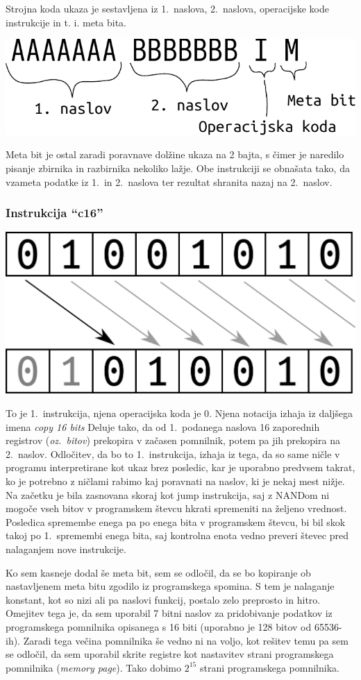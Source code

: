 \documentclass[12pt]{article}
\begin{document}
Strojna koda ukaza je sestavljena iz 1.\ naslova, 2.\ naslova, operacijske kode instrukcije in t. i. meta bita.

\begin{center}
  \includegraphics[width=.5\linewidth]{slike/instrukcija.pdf}
\end{center}

Meta bit je ostal zaradi poravnave dolžine ukaza na 2 bajta, s čimer je naredilo pisanje zbirnika in razbirnika nekoliko lažje.
Obe instrukciji se obnašata tako, da vzameta podatke iz 1.\ in 2.\ naslova ter rezultat shranita nazaj na 2.\ naslov.
\pagebreak
\subsubsection{Instrukcija ``c16''}

\begin{center}
  \includegraphics[width=.3\linewidth]{slike/predstavitev/copy.png}
\end{center}

To je 1.\ instrukcija, njena operacijska koda je $0$.
Njena notacija izhaja iz daljšega imena \textit{copy 16 bits}
Deluje tako, da od 1.\ podanega naslova 16 zaporednih registrov (\textit{oz.\ bitov}) prekopira v začasen pomnilnik, potem pa jih prekopira na 2.\ naslov.
Odločitev, da bo to 1.\ instrukcija, izhaja iz tega, da so same ničle v programu interpretirane kot ukaz brez posledic, kar je uporabno predvsem takrat, ko je potrebno z ničlami rabimo kaj poravnati na naslov, ki je nekaj mest nižje.
Na začetku je bila zasnovana skoraj kot jump instrukcija, saj z NANDom ni mogoče vseh bitov v programskem števcu hkrati spremeniti na željeno vrednost.
Posledica spremembe enega pa po enega bita v programskem števcu, bi bil skok takoj po 1.\ spremembi enega bita, saj kontrolna enota vedno preveri števec pred nalaganjem nove instrukcije.

Ko sem kasneje dodal še meta bit, sem se odločil, da se bo kopiranje ob nastavljenem meta bitu zgodilo iz programskega spomina.
S tem je nalaganje konstant, kot so nizi ali pa naslovi funkcij, postalo zelo preprosto in hitro.
Omejitev tega je, da sem uporabil 7 bitni naslov za pridobivanje podatkov iz programskega pomnilnika opisanega s 16 biti (uporabno je 128 bitov od 65536-ih).
Zaradi tega večina pomnilnika še vedno ni na voljo, kot rešitev temu pa sem se odločil, da sem uporabil skrite registre kot nastavitev strani programskega pomnilnika (\textit{memory page}).
Tako dobimo $2^{15}$ strani programskega pomnilnika.
\end{document}
